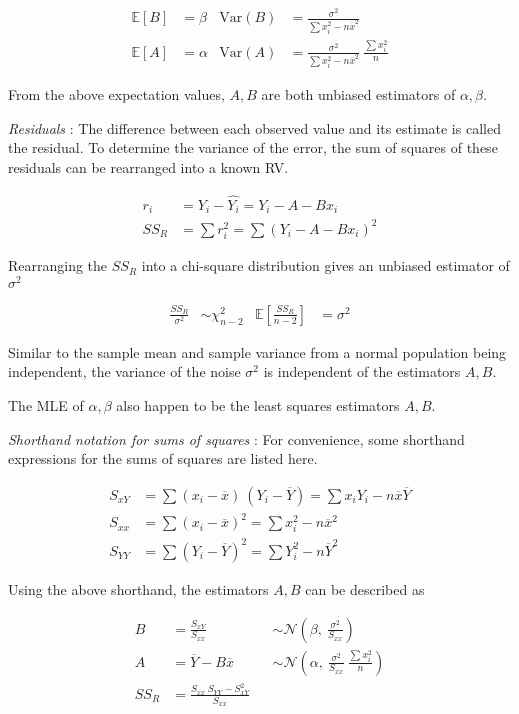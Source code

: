 \begin{align}
	\mathbb{E}[B] &= \beta & \mathrm{Var}(B) &= \frac{\sigma^2}{\sum x_i^2  - n\overline{x}^2} \\
	\mathbb{E}[A] &= \alpha & \mathrm{Var}(A) &= \frac{\sigma^2}{\sum x_i^2  - n\overline{x}^2}\ \frac{\sum x_i^2}{n}
\end{align}

From the above expectation values, $ A, B $ are both unbiased estimators of $ \alpha, \beta $.

\textit{Residuals} : The difference between each observed value and its estimate is called the residual. To determine the variance of the error, the sum of squares of these residuals can be rearranged into a known RV.

\begin{align}
	r_i &= Y_i - \widehat{Y_i} = Y_i - A - B x_i \\
	SS_R &= \sum r_i^2 = \sum (Y_i - A - B x_i)^2
\end{align}

Rearranging the $ SS_R $ into a chi-square distribution gives an unbiased estimator of $ \sigma^2 $

\begin{align}
	\frac{SS_R}{\sigma^2} &\sim \chi^2_{n-2} & \mathbb{E}\left[ \frac{SS_R}{n-2} \right] &= \sigma^2
\end{align}

Similar to the sample mean and sample variance from a normal population being independent, the variance of the noise $ \sigma^2 $ is independent of the estimators $ A, B $.

The MLE of $ \alpha, \beta $ also happen to be the least squares estimators $ A, B $.

\textit{Shorthand notation for sums of squares} : For convenience, some shorthand expressions for the sums of squares are listed here.

\begin{align}
	S_{xY} &= \sum (x_i - \overline{x})\ (Y_i - \overline{Y}) = \sum x_i Y_i - n \overline{x} \overline{Y} \\
	S_{xx} &= \sum (x_i - \overline{x})^2 = \sum x_i^2 - n\overline{x}^2 \\
	S_{YY} &= \sum (Y_i - \overline{Y})^2 = \sum Y_i^2 - n\overline{Y}^2
\end{align}

Using the above shorthand, the estimators $ A, B $ can be described as

\begin{align}
	B &= \frac{S_{xY}}{S_{xx}} &&\sim \mathcal{N}\left( \beta,\ \frac{\sigma^2}{S_{xx}} \right) \\
	A &= \overline{Y} - B\overline{x} &&\sim  \mathcal{N}\left( \alpha,\ \frac{\sigma^2}{S_{xx}}\ \frac{\sum x_i^2}{n} \right) \\
	SS_R &= \frac{S_{xx}\ S_{YY} - S_{xY}^2}{S_{xx}}
\end{align}

